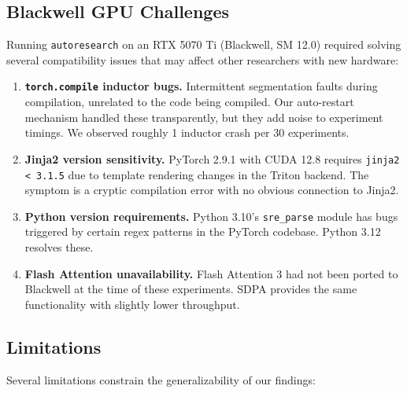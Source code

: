 \documentclass[11pt]{article}
\begin{document}
\subsection{Blackwell GPU Challenges}
\label{sec:blackwell}

Running \texttt{autoresearch} on an RTX 5070 Ti (Blackwell, SM 12.0) required solving several compatibility issues that may affect other researchers with new hardware:

\begin{enumerate}[leftmargin=*]
    \item \textbf{\texttt{torch.compile} inductor bugs.} Intermittent segmentation faults during compilation, unrelated to the code being compiled. Our auto-restart mechanism handled these transparently, but they add noise to experiment timings. We observed roughly 1 inductor crash per 30 experiments.
    \item \textbf{Jinja2 version sensitivity.} PyTorch 2.9.1 with CUDA 12.8 requires \texttt{jinja2 < 3.1.5} due to template rendering changes in the Triton backend. The symptom is a cryptic compilation error with no obvious connection to Jinja2.
    \item \textbf{Python version requirements.} Python 3.10's \texttt{sre\_parse} module has bugs triggered by certain regex patterns in the PyTorch codebase. Python 3.12 resolves these.
    \item \textbf{Flash Attention unavailability.} Flash Attention 3 \citep{dao2024flashattention3} had not been ported to Blackwell at the time of these experiments. SDPA provides the same functionality with slightly lower throughput.
\end{enumerate}

\subsection{Limitations}
\label{sec:limitations}

Several limitations constrain the generalizability of our findings:
\end{document}
